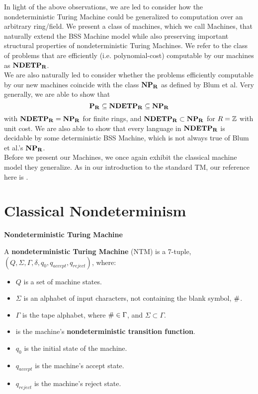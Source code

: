 In light of the above observations, we are led to consider how the
nondeterministic Turing Machine could be generalized to computation
over an arbitrary ring/field.  We present a class of machines, which
we call \ndet Machines, that naturally extend the BSS
Machine model while also preserving important structural properties of
nondeterministic Turing Machines.  We refer to the class of problems
that are efficiently (i.e. polynomial-cost) computable by our machines
as $\mathbf{NDETP_R}$.\\

We are also naturally led to consider whether the problems efficiently
computable by our new machines coincide with the class $\mathbf{NP_R}$ as
defined by Blum et al.  Very generally, we are able to show that
$$\mathbf{P_R} \subseteq \mathbf{NDETP_R} \subseteq \mathbf{NP_R}$$
with $\mathbf{NDETP_R} = \mathbf{NP_R}$ for finite rings, and $\mathbf{NDETP_R} \subset \mathbf{NP_R}$ for $R
= \mathbb{Z}$ with unit cost.  We are also able to show that every
language in $\mathbf{NDETP_R}$ is decidable by some deterministic BSS Machine,
which is not always true of Blum et al.'s $\mathbf{NP_R}$.\\

Before we present our \ndet Machines, we once again exhibit the
classical machine model they generalize.  As in our introduction to
the standard TM, our reference here is \cite{S06}.

\section{Classical Nondeterminism}

\begin{definition}{\textbf{Nondeterministic Turing Machine}}
  
  A \textbf{nondeterministic Turing Machine} (NTM) is a 7-tuple, $(Q,
  \Sigma, \Gamma, \delta, q_0, q_{accept}, q_{reject})$, where:
  
  \begin{itemize}
  \item $Q$ is a set of machine states.
  \item $\Sigma$ is an alphabet of input characters, not containing
    the blank symbol, $\#$.
  \item $\Gamma$ is the tape alphabet, where $\# \in \Gamma$, and
    $\Sigma \subset \Gamma$.
  \item {} is the machine's
    \textbf{nondeterministic transition function}.
  \item $q_0$ is the initial state of the machine.
  \item $q_{accept}$ is the machine's accept state.
  \item $q_{reject}$ is the machine's reject state.
  \end{itemize}
  
\end{definition}

